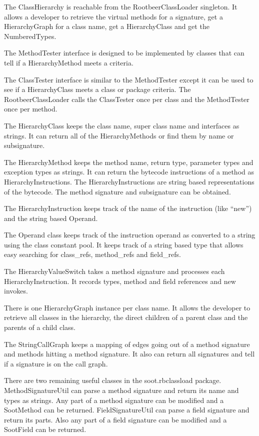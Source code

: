 \documentclass[preprint]{sigplanconf}
\begin{document}
The ClassHierarchy is reachable from the RootbeerClassLoader singleton. It allows a developer to retrieve the virtual methods for a signature, get a HierarchyGraph for a class name, get a HierarchyClass and get the NumberedTypes.

The MethodTester interface is designed to be implemented by classes that can tell if a HierarchyMethod meets a criteria.

The ClassTester interface is similar to the MethodTester except it can be used to see if a HierarchyClass meets a class or package criteria. The RootbeerClassLoader calls the ClassTester once per class and the MethodTester once per method.

The HierarchyClass keeps the class name, super class name and interfaces as strings. It can return all of the HierarchyMethods or find them by name or subsignature.

The HierarchyMethod keeps the method name, return type, parameter types and exception types as strings. It can return the bytecode instructions of a method as HierarchyInstructions. The HierarchyInstructions are string based representations of the bytecode. The method signature and subsignature can be obtained.

The HierarchyInstruction keeps track of the name of the instruction (like “new”) and the string based Operand.

The Operand class keeps track of the instruction operand as converted to a string using the class constant pool. It keeps track of a string based type that allows easy searching for class\_refs, method\_refs and field\_refs.

The HierarchyValueSwitch takes a method signature and processes each HierarchyInstruction. It records types, method and field references and new invokes.

There is one HierarchyGraph instance per class name. It allows the developer to retrieve all classes in the hierarchy, the direct children of a parent class and the parents of a child class. 


The StringCallGraph keeps a mapping of edges going out of a method signature and methods hitting a method signature. It also can return all signatures and tell if a signature is on the call graph.

There are two remaining useful classes in the soot.rbclassload package. MethodSignatureUtil can parse a method signature and return its name and types as strings. Any part of a method signature can be modified and a SootMethod can be returned. FieldSignatureUtil can parse a field signature and return its parts. Also any part of a field signature can be modified and a SootField can be returned.
\end{document}
